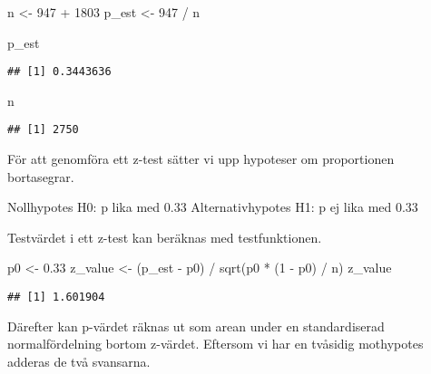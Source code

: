 \documentclass[
]{book}
\newenvironment{Shaded}{\begin{snugshade}}{\end{snugshade}}
\newcommand{\DecValTok}[1]{\textcolor[rgb]{0.00,0.00,0.81}{#1}}
\newcommand{\FloatTok}[1]{\textcolor[rgb]{0.00,0.00,0.81}{#1}}
\newcommand{\FunctionTok}[1]{\textcolor[rgb]{0.00,0.00,0.00}{#1}}
\newcommand{\NormalTok}[1]{#1}
\newcommand{\OtherTok}[1]{\textcolor[rgb]{0.56,0.35,0.01}{#1}}
\newcommand{\SpecialCharTok}[1]{\textcolor[rgb]{0.00,0.00,0.00}{#1}}
\theoremstyle{definition}
\theoremstyle{definition}
\theoremstyle{definition}
\theoremstyle{definition}
\theoremstyle{remark}
\begin{document}
\begin{Shaded}
\begin{Highlighting}[]
\NormalTok{n }\OtherTok{\textless{}{-}} \DecValTok{947} \SpecialCharTok{+} \DecValTok{1803}
\NormalTok{p\_est }\OtherTok{\textless{}{-}} \DecValTok{947} \SpecialCharTok{/}\NormalTok{ n}

\NormalTok{p\_est}
\end{Highlighting}
\end{Shaded}

\begin{verbatim}
## [1] 0.3443636
\end{verbatim}

\begin{Shaded}
\begin{Highlighting}[]
\NormalTok{n}
\end{Highlighting}
\end{Shaded}

\begin{verbatim}
## [1] 2750
\end{verbatim}

För att genomföra ett z-test sätter vi upp hypoteser om proportionen bortasegrar.

Nollhypotes H0: p lika med 0.33
Alternativhypotes H1: p ej lika med 0.33

Testvärdet i ett z-test kan beräknas med testfunktionen.

\begin{Shaded}
\begin{Highlighting}[]
\NormalTok{p0 }\OtherTok{\textless{}{-}} \FloatTok{0.33}
\NormalTok{z\_value }\OtherTok{\textless{}{-}}\NormalTok{ (p\_est }\SpecialCharTok{{-}}\NormalTok{ p0) }\SpecialCharTok{/} \FunctionTok{sqrt}\NormalTok{(p0 }\SpecialCharTok{*}\NormalTok{ (}\DecValTok{1} \SpecialCharTok{{-}}\NormalTok{ p0) }\SpecialCharTok{/}\NormalTok{ n)}
\NormalTok{z\_value}
\end{Highlighting}
\end{Shaded}

\begin{verbatim}
## [1] 1.601904
\end{verbatim}

Därefter kan p-värdet räknas ut som arean under en standardiserad normalfördelning bortom z-värdet. Eftersom vi har en tvåsidig mothypotes adderas de två svansarna.
\end{document}
